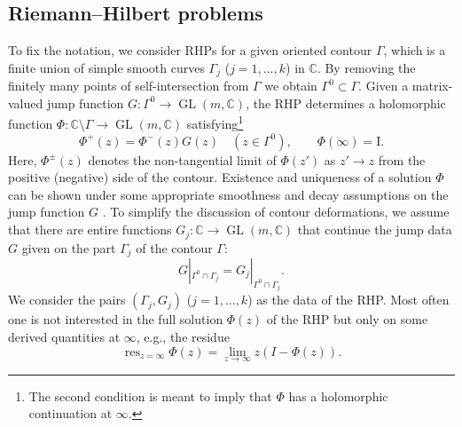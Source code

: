 \documentclass[reqno]{amsart}
\newcommand{\C}{\mathbb{C}}
\newcommand{\I}{\mathrm{I}}
\DeclareMathOperator*{\res}{res}
\DeclareMathOperator*{\GL}{GL}
\begin{document}
\subsection*{Riemann--Hilbert problems} To fix the notation, we 
consider RHPs for a given oriented contour $\Gamma$, which is
a finite union of simple smooth curves $\Gamma_j$ ($j=1,\ldots,k$) in $\C$. 
By removing the finitely many points of self-intersection from $\Gamma$ we obtain $\Gamma^0\subset \Gamma$. 
Given a matrix-valued jump function $G:\Gamma^0\to \GL(m,\C)$, the RHP 
determines a holomorphic function $\Phi : \C \setminus \Gamma \to \GL(m,\C)$ satisfying\footnote{The second condition is meant to imply that $\Phi$ has a holomorphic continuation at $\infty$.}
\[
	\Phi^+(z) = \Phi^-(z) G(z) \quad (z \in \Gamma^0), \qquad
	\Phi(\infty) = \I.
\]
Here, $\Phi^\pm(z)$ denotes the non-tangential limit of $\Phi(z')$ as $z' \to z$ from the positive (negative) side of the contour. 
Existence and uniqueness of a solution $\Phi$ can be shown under some appropriate
smoothness and decay assumptions on the jump function $G$  \cite{MR1677884}. To simplify the discussion of
contour deformations, we assume that there are entire functions $G_j: \C\to \GL(m,\C)$ that continue
the jump data $G$ given on the part $\Gamma_j$ of the contour $\Gamma$:
\[
G|_{\Gamma^0\cap\Gamma_j} = G_j|_{\Gamma^0\cap\Gamma_j}.
\]
We consider the pairs $(\Gamma_j,G_j)$ ($j=1,\ldots, k$) as the data of the RHP. Most often one is not interested
in the full solution $\Phi(z)$ of the RHP but only on some derived quantities at $\infty$, e.g., the
residue
\[
\res_{z=\infty} \Phi(z) = \lim_{z\to\infty} z (I - \Phi(z)).
\]
\end{document}
